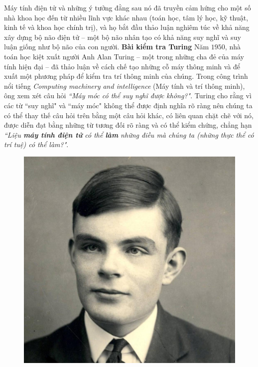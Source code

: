 \begin{multicols}{2}
	\vskip 0.1cm
	Máy tính điện tử và những ý tưởng đằng sau nó đã truyền cảm hứng cho một số nhà khoa học đến từ nhiều lĩnh vực khác nhau (toán học, tâm lý học, kỹ thuật, kinh tế và khoa học chính trị), và họ bắt đầu thảo luận nghiêm túc về khả năng xây dựng  bộ não điện tử -- một bộ não nhân tạo có khả năng suy nghĩ và suy luận giống như bộ não của con người.
	\vskip 0.1cm
	\textbf{\color{cackithi}Bài kiểm tra Turing}
	\vskip 0.1cm
	Năm $1950$, nhà toán học kiệt xuất người Anh Alan Turing -- một trong những cha đẻ của máy tính hiện đại -- đã thảo luận về cách chế tạo những cỗ máy thông minh và để xuất một phương pháp để kiểm tra trí thông minh của chúng. Trong công trình nổi tiếng \textit{Computing machinery and
		intelligence} (Máy tính và trí thông minh), ông xem xét câu hỏi \textit{``Máy móc có thể suy nghĩ được không?"}. Turing cho rằng vì các từ ``suy nghĩ" và ``máy móc" không thể được định nghĩa rõ ràng nên chúng ta có thể thay thế câu hỏi trên bằng một câu hỏi khác, có liên quan chặt chẽ với nó, được diễn đạt bằng những từ tương đối rõ ràng và có thể kiểm chứng, chẳng hạn \textit{``Liệu \textbf{\color{cackithi}máy tính điện tử} có thể \textbf{\color{cackithi}làm} những điều mà chúng ta (những thực thể có trí tuệ) có thể làm?"}.
	\begin{figure}[H]
		\vspace*{-5pt}
		\centering
		\captionsetup{labelformat= empty, justification=centering}
		\includegraphics[width= 1\linewidth]{Alan-Turing.jpg}

\end{figure}
\end{multicols}

